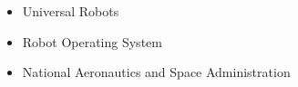 \newcommand{\acronym}[2]{
    \item [\textbf{#1}] #2
}

\begin{itemize}[labelwidth=3cm,align=left,itemindent=3cm,itemsep=4pt]


    \acronym{UR}{Universal Robots}
    \acronym{ROS}{Robot Operating System}
    \acronym{NASA}{National Aeronautics and Space Administration}

\end{itemize}